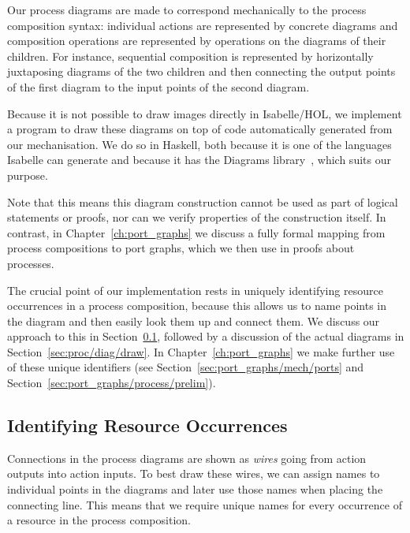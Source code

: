 \documentclass[class=smolathesis,crop=false]{standalone}
\begin{document}
Our process diagrams are made to correspond mechanically to the process composition syntax: individual actions are represented by concrete diagrams and composition operations are represented by operations on the diagrams of their children.
For instance, sequential composition is represented by horizontally juxtaposing diagrams of the two children and then connecting the output points of the first diagram to the input points of the second diagram.

Because it is not possible to draw images directly in Isabelle/HOL, we implement a program to draw these diagrams on top of code automatically generated from our mechanisation.
We do so in Haskell, both because it is one of the languages Isabelle can generate and because it has the Diagrams library~\cite{ryan_yorgey-2015}, which suits our purpose.

Note that this means this diagram construction cannot be used as part of logical statements or proofs, nor can we verify properties of the construction itself.
In contrast, in Chapter~\ref{ch:port_graphs} we discuss a fully formal mapping from process compositions to port graphs, which we then use in proofs about processes.

The crucial point of our implementation rests in uniquely identifying resource occurrences in a process composition, because this allows us to name points in the diagram and then easily look them up and connect them.
We discuss our approach to this in Section~\ref{sec:proc/diag/paths}, followed by a discussion of the actual diagrams in Section~\ref{sec:proc/diag/draw}.
In Chapter~\ref{ch:port_graphs} we make further use of these unique identifiers (see Section~\ref{sec:port_graphs/mech/ports} and Section~\ref{sec:port_graphs/process/prelim}).

\subsection{Identifying Resource Occurrences}
\label{sec:proc/diag/paths}

Connections in the process diagrams are shown as \emph{wires} going from action outputs into action inputs.
To best draw these wires, we can assign names to individual points in the diagrams and later use those names when placing the connecting line.
This means that we require unique names for every occurrence of a resource in the process composition.
\end{document}
